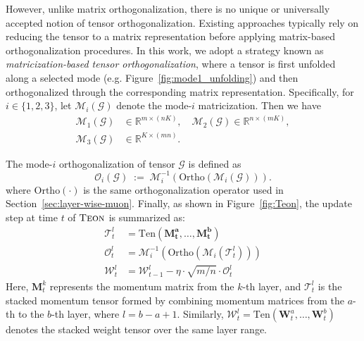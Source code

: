 \documentclass{article}
\newcommand{\ten}[1]{\bm{\mathcal{#1}}}
\newcommand{\mat}[1]{\mathbf{#1}}
\theoremstyle{plain}
\theoremstyle{definition}
\theoremstyle{remark}
\begin{document}
However, unlike matrix orthogonalization, there is no unique or universally accepted notion of tensor orthogonalization. Existing approaches typically rely on reducing the tensor to a matrix representation before applying matrix-based orthogonalization procedures.
In this work, we adopt a strategy known as \emph{matricization-based tensor orthogonalization}, where a tensor is first unfolded along a selected mode (e.g. Figure~\ref{fig:mode1_unfolding}) and then orthogonalized through the corresponding matrix representation. Specifically, for $i\in\{1,2,3\}$, let $\mathcal{M}_i(\ten{G})$ denote the mode-$i$ matricization. Then we have
\begin{equation}
\label{eq:mode-matricizations}
\begin{aligned}
\mathcal{M}_1(\ten{G}) &\in \mathbb{R}^{m\times (nK)}, \quad
\mathcal{M}_2(\ten{G}) \in \mathbb{R}^{n\times (mK)},\\
\mathcal{M}_3(\ten{G}) &\in \mathbb{R}^{K\times (mn)}.
\end{aligned}
\end{equation}

The mode-$i$ orthogonalization of tensor $\ten{G}$ is defined as 
\begin{equation}
\label{eq:mode-k-orthogonalization}
{
\mathcal{O}_i(\mathcal{G})
\;:=\;
\mathcal{M}_i^{-1}
\!\left(
\mathrm{Ortho}\!\left(
\mathcal{M}_i(\mathcal{G})
\right)
\right).
}
\end{equation}
where $\mathrm{Ortho}(\cdot)$ is the same orthogonalization operator used in Section~\ref{sec:layer-wise-muon}. Finally, as shown in Figure~\ref{fig:Teon}, the update step at time $t$ of $\textsc{Teon}$ is summarized as: 
\begin{equation}
\begin{aligned}
\ten{T}^l_t &= \text{Ten}(\mat{M_t^a},\dots,\mat{M^b_t})\\
\ten{O}^l_t &= \mathcal{M}^{-1}_i(\mathrm{Ortho}(\mathcal{M}_i(\ten{T}^l_t))) \\
\ten{W}^l_{t} &= \ten{W}^l_{t-1} - \eta \cdot \sqrt{m/n} \cdot \ten{O}^l_t
\end{aligned}
\end{equation}
Here, $\mat{M}^k_t$ represents the momentum matrix from the $k$-th layer, and $\ten{T}^l_t$ is the stacked momentum tensor formed by combining momentum matrices from the $a$-th to the $b$-th layer, where $l = b - a + 1$. Similarly, $\ten{W}^l_t = \mathrm{Ten}(\mat{W}^a_t, \dots, \mat{W}^b_t)$ denotes the stacked weight tensor over the same layer range. 
\end{document}
